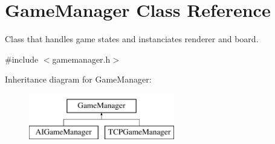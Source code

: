 \hypertarget{classGameManager}{\section{\-Game\-Manager \-Class \-Reference}
\label{classGameManager}
}


\-Class that handles game states and instanciates renderer and board.  




{\ttfamily \#include $<$gamemanager.\-h$>$}

\-Inheritance diagram for \-Game\-Manager\-:\begin{figure}[H]
\begin{center}
\leavevmode
\includegraphics[height=2.000000cm]{classGameManager}
\end{center}
\end{figure}
